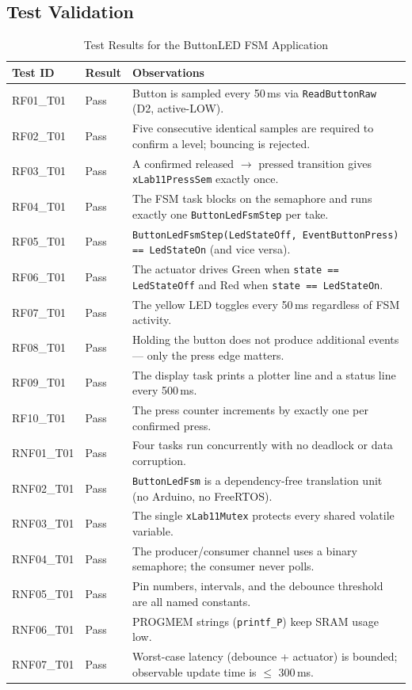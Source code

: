 \documentclass[12pt]{article}
\begin{document}
\subsection{Test Validation}

\begin{table}[H]
\centering
\begin{tabular}{@{}llp{7.5cm}@{}}
\toprule
\textbf{Test ID} & \textbf{Result} & \textbf{Observations} \\
\midrule
RF01\_T01  & Pass & Button is sampled every 50\,ms via \texttt{ReadButtonRaw} (D2, active-LOW). \\
RF02\_T01  & Pass & Five consecutive identical samples are required to confirm a level; bouncing is rejected. \\
RF03\_T01  & Pass & A confirmed released $\to$ pressed transition gives \texttt{xLab11PressSem} exactly once. \\
RF04\_T01  & Pass & The FSM task blocks on the semaphore and runs exactly one \texttt{ButtonLedFsmStep} per take. \\
RF05\_T01  & Pass & \texttt{ButtonLedFsmStep(LedStateOff, EventButtonPress) == LedStateOn} (and vice versa). \\
RF06\_T01  & Pass & The actuator drives Green when \texttt{state == LedStateOff} and Red when \texttt{state == LedStateOn}. \\
RF07\_T01  & Pass & The yellow LED toggles every 50\,ms regardless of FSM activity. \\
RF08\_T01  & Pass & Holding the button does not produce additional events --- only the press edge matters. \\
RF09\_T01  & Pass & The display task prints a plotter line and a status line every 500\,ms. \\
RF10\_T01  & Pass & The press counter increments by exactly one per confirmed press. \\
RNF01\_T01 & Pass & Four tasks run concurrently with no deadlock or data corruption. \\
RNF02\_T01 & Pass & \texttt{ButtonLedFsm} is a dependency-free translation unit (no Arduino, no FreeRTOS). \\
RNF03\_T01 & Pass & The single \texttt{xLab11Mutex} protects every shared volatile variable. \\
RNF04\_T01 & Pass & The producer/consumer channel uses a binary semaphore; the consumer never polls. \\
RNF05\_T01 & Pass & Pin numbers, intervals, and the debounce threshold are all named constants. \\
RNF06\_T01 & Pass & PROGMEM strings (\texttt{printf\_P}) keep SRAM usage low. \\
RNF07\_T01 & Pass & Worst-case latency (debounce + actuator) is bounded; observable update time is $\le$ 300\,ms. \\
\bottomrule
\end{tabular}
\caption{Test Results for the ButtonLED FSM Application}
\label{tab:tests}
\end{table}
\end{document}
